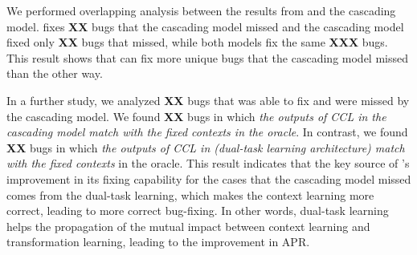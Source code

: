 We performed overlapping analysis between the results
from {\tool} and the cascading model. {\tool} fixes {\bf XX} bugs that
the cascading model missed and the cascading model fixed only {\bf XX}
bugs that {\tool} missed, while both models fix the same {\bf XXX}
bugs. This result shows that {\tool} can fix more unique bugs
that the cascading model missed than the other way.

In a further study, we analyzed {\bf XX} bugs that {\tool} was able to
fix and were missed by the cascading model. We found {\bf XX} bugs in
which {\em the outputs of CCL in the cascading model match with the
  fixed contexts in the oracle}. In contrast, we found {\bf XX} bugs
in which {\em the outputs of CCL in {\tool} (dual-task learning
  architecture) match with the fixed contexts} in the oracle. This
result indicates that the key source of {\tool}'s improvement in its
fixing capability for the cases that the cascading model missed comes
from the dual-task learning, which makes the context learning more
correct, leading to more correct bug-fixing. In other words,
dual-task learning helps the propagation of the mutual impact between
context learning and transformation learning, leading to the improvement in APR.







